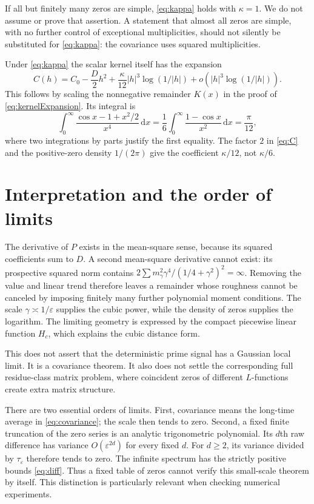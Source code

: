 \documentclass[11pt]{article}
\theoremstyle{definition}\newtheorem{definition}[theorem]{Definition}
\theoremstyle{remark}\newtheorem{remark}[theorem]{Remark}
\newcommand{\dd}{\,\mathrm d}
\newcommand{\eps}{\varepsilon}
\newcommand{\tauE}{\tau_\eps}
\begin{document}
If all but finitely many zeros are simple, \eqref{eq:kappa} holds with
$\kappa=1$. We do not assume or prove that assertion. A statement that
almost all zeros are simple, with no further control of exceptional
multiplicities, should not silently be substituted for
\eqref{eq:kappa}: the covariance uses squared multiplicities.

Under \eqref{eq:kappa} the scalar kernel itself has the expansion
\begin{equation}\label{eq:cubicK}
 C(h)=C_0-\frac D2h^2+
 \frac\kappa{12}|h|^3\log(1/|h|)+o(|h|^3\log(1/|h|)).
\end{equation}
This follows by scaling the nonnegative remainder $K(x)$ in the proof
of \eqref{eq:kernelExpansion}. Its integral is
\[
 \int_0^\infty\frac{\cos x-1+x^2/2}{x^4}\dd x
 =\frac16\int_0^\infty\frac{1-\cos x}{x^2}\dd x=\frac\pi{12},
\]
where two integrations by parts justify the first equality. The factor
$2$ in \eqref{eq:C} and the positive-zero density $1/(2\pi)$ give the
coefficient $\kappa/12$, not $\kappa/6$.

\section{Interpretation and the order of limits}
The derivative of $P$ exists in the mean-square sense, because its
squared coefficients sum to $D$. A second mean-square derivative
cannot exist: its prospective squared norm contains
$2\sum m_\gamma^2\gamma^4/(1/4+\gamma^2)^2=\infty$.
Removing the value and linear trend therefore leaves a remainder
whose roughness cannot be canceled by imposing finitely many further
polynomial moment conditions. The scale $\gamma\asymp1/\eps$ supplies
the cubic power, while the density of zeros supplies the logarithm.
The limiting geometry is expressed by the compact piecewise linear
function $H_c$, which explains the cubic distance form.

This does not assert that the deterministic prime signal has a
Gaussian local limit. It is a covariance theorem. It also does not
settle the corresponding full residue-class matrix problem, where
coincident zeros of different $L$-functions create extra matrix
structure.

There are two essential orders of limits. First, covariance means the
long-time average in \eqref{eq:covariance}; the scale then tends to zero.
Second, a fixed finite truncation of the zero series is an analytic
trigonometric polynomial. Its $d$th raw difference has variance
$O(\eps^{2d})$ for every fixed $d$. For $d\ge2$, its variance divided
by $\tauE$ therefore tends to zero. The infinite spectrum has the
strictly positive bounds \eqref{eq:diff}. Thus a fixed table of zeros
cannot verify this small-scale theorem by itself. This distinction is
particularly relevant when checking numerical experiments.
\end{document}
